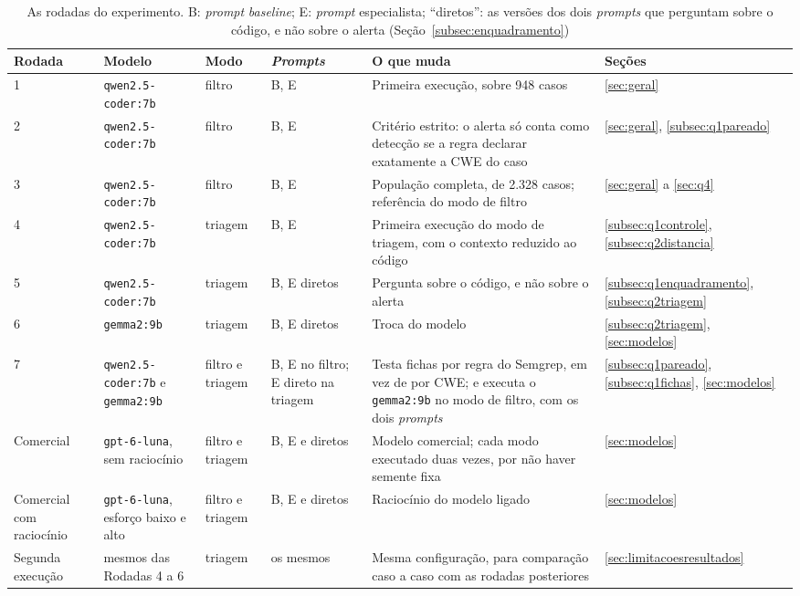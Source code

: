 \begin{table}[htpb]
    \centering
    \caption[As rodadas do experimento]{As rodadas do experimento. B: \textit{prompt} \textit{baseline}; E: \textit{prompt} especialista; ``diretos'': as versões dos dois \textit{prompts} que perguntam sobre o código, e não sobre o alerta (Seção~\ref{subsec:enquadramento})}
    \label{tab:rodadas}
    \renewcommand{\arraystretch}{1.3}
    \setlength{\tabcolsep}{3pt}
    \footnotesize
    \begin{tabular}{|p{1.7cm}|p{3.0cm}|p{1.4cm}|p{1.9cm}|p{4.6cm}|p{1.5cm}|}
        \hline
        \textbf{Rodada} & \textbf{Modelo} & \textbf{Modo} & \textbf{\textit{Prompts}} & \textbf{O que muda} & \textbf{Seções} \\
        \hline
        1 & \texttt{qwen2.5-coder:7b} & filtro & B, E & Primeira execução, sobre 948 casos & \ref{sec:geral} \\
        \hline
        2 & \texttt{qwen2.5-coder:7b} & filtro & B, E & Critério estrito: o alerta só conta como detecção se a regra declarar exatamente a CWE do caso & \ref{sec:geral}, \ref{subsec:q1pareado} \\
        \hline
        3 & \texttt{qwen2.5-coder:7b} & filtro & B, E & População completa, de 2.328 casos; referência do modo de filtro & \ref{sec:geral} a \ref{sec:q4} \\
        \hline
        4 & \texttt{qwen2.5-coder:7b} & triagem & B, E & Primeira execução do modo de triagem, com o contexto reduzido ao código & \ref{subsec:q1controle}, \ref{subsec:q2distancia} \\
        \hline
        5 & \texttt{qwen2.5-coder:7b} & triagem & B, E diretos & Pergunta sobre o código, e não sobre o alerta & \ref{subsec:q1enquadramento}, \ref{subsec:q2triagem} \\
        \hline
        6 & \texttt{gemma2:9b} & triagem & B, E diretos & Troca do modelo & \ref{subsec:q2triagem}, \ref{sec:modelos} \\
        \hline
        7 & \texttt{qwen2.5-coder:7b} e \texttt{gemma2:9b} & filtro e triagem & B, E no filtro; E direto na triagem & Testa fichas por regra do Semgrep, em vez de por CWE; e executa o \texttt{gemma2:9b} no modo de filtro, com os dois \textit{prompts} & \ref{subsec:q1pareado}, \ref{subsec:q1fichas}, \ref{sec:modelos} \\
        \hline
        Comercial & \texttt{gpt-6-luna}, sem raciocínio & filtro e triagem & B, E e diretos & Modelo comercial; cada modo executado duas vezes, por não haver semente fixa & \ref{sec:modelos} \\
        \hline
        Comercial com raciocínio & \texttt{gpt-6-luna}, esforço baixo e alto & filtro e triagem & B, E e diretos & Raciocínio do modelo ligado & \ref{sec:modelos} \\
        \hline
        Segunda execução & mesmos das Rodadas 4 a 6 & triagem & os mesmos & Mesma configuração, para comparação caso a caso com as rodadas posteriores & \ref{sec:limitacoesresultados} \\
        \hline
    \end{tabular}
    \fontepesquisa
\end{table}

